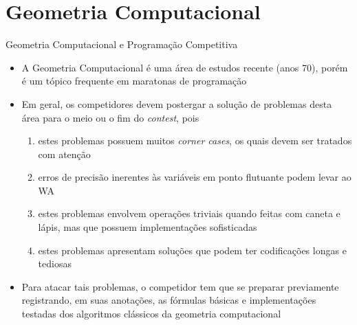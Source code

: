 \section{Geometria Computacional}

\begin{frame}[fragile]{Geometria Computacional e Programação Competitiva}

    \begin{itemize}
        \item A Geometria Computacional é uma área de estudos recente (anos 70), porém é um tópico 
        frequente em maratonas de programação
        \pause

        \item Em geral, os competidores devem postergar a solução de problemas desta área para o meio ou o fim do \textit{contest}, pois
        \pause

        \begin{enumerate}
            \item estes problemas possuem muitos \textit{corner cases}, os quais devem ser tratados com atenção
        \pause
            \item erros de precisão inerentes às variáveis em ponto flutuante podem levar ao WA
        \pause
            \item estes problemas envolvem operações triviais quando feitas com caneta e lápis, mas que possuem implementações sofisticadas
        \pause
            \item estes problemas apresentam soluções que podem ter codificações longas e tediosas
        \end{enumerate}
        \pause

        \item Para atacar tais problemas, o competidor tem que se preparar previamente registrando, em suas anotações, as fórmulas básicas e implementações testadas dos algoritmos clássicos da geometria computacional
    \end{itemize}

\end{frame}

